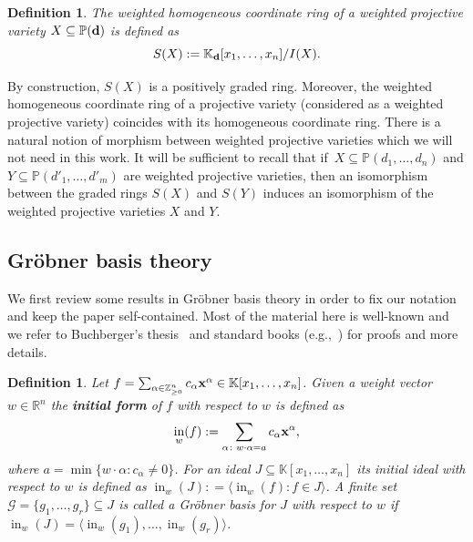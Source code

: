 \documentclass[10pt,a4paper]{amsart}
\newcommand{\thlabel}[1]{\label{#1}}
\newtheorem{Definition}[Theorem]{Definition}
\numberwithin{equation}{section}
\DeclareMathOperator{\init}{in}
\begin{document}
\begin{Definition}
The {\it weighted homogeneous coordinate ring} of a weighted projective variety $X\subseteq \mathbb P ({\bf d})$ is defined as
\begin{displaymath}
S(X):= \mathbb{K}_{\bf d}[x_1,\dots , x_n]/ I(X).
\end{displaymath}
\end{Definition}
By construction, $S(X)$ is a positively graded ring. Moreover, the weighted homogeneous coordinate ring of a projective variety (considered as a weighted projective variety) coincides with its homogeneous coordinate ring.
There is a natural notion of morphism between weighted projective varieties which we will not need in this work.
It will be sufficient to recall that if~$X\subseteq \mathbb P(d_1, \dots , d_n)$ and $Y\subseteq \mathbb P(d'_1, \dots , d'_m)$ are weighted projective varieties, then an isomorphism between the graded rings $S(X)$ and $S(Y)$ induces an isomorphism of the weighted projective varieties $X$ and $Y$.




\subsection{Gr\"obner basis theory}
We first review some results in Gr\"obner basis theory %
in order to fix our notation and
keep the paper self-contained. Most of the material here is well-known and we refer to Buchberger's thesis~\cite{buchberger2006bruno} and standard books (e.g.,~\cite{loustaunau1994introduction,herzog2011monomial,kreuzer2005computational,GB_Bernd}) for proofs and more details.


\begin{Definition}\thlabel{def:init}
Let $f = \sum_{\alpha\in \mathbb{Z}^n_{\geq 0}} c_{\alpha} {\bf x}^{\alpha} \in \mathbb K[x_1, \dots , x_n]$.
Given a {\it weight vector} $w\in \mathbb R^n$ the {\bf initial form} of $f$ with respect to $w$ is defined as
\begin{displaymath}
\init_w(f):=\sum_{\alpha\colon w\cdot \alpha=a} c_{\alpha}{\bf x}^{\alpha},
\end{displaymath}
where $a= \min \{w\cdot \alpha \colon c_{\alpha}\not =0\}$. For an ideal $J\subseteq \mathbb K[x_1, \dots , x_n]$ its {\it initial ideal} with respect to $w$ is defined as $\init_w(J)\colon =\langle \init_w(f)\colon f\in J\rangle$.
A finite set $\mathcal{G}=\{g_1,\ldots,g_r\}\subseteq J$ is called a {\it Gr\"obner basis} for $J$
with respect to $w$ if $\init_w(J)=\langle \init_w(g_1),\ldots,\init_w(g_r)\rangle$.
\end{Definition}
\end{document}
